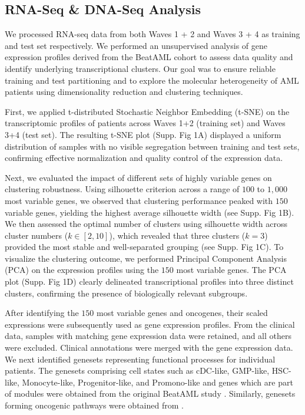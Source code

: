 \documentclass[pdflatex,sn-mathphys-num]{sn-jnl}%
\theoremstyle{thmstyleone}%
\theoremstyle{thmstyletwo}%
\theoremstyle{thmstylethree}%
\begin{document}
\subsection{RNA-Seq \& DNA-Seq Analysis}
We processed RNA-seq data from both Waves 1 + 2 and Waves 3 + 4 as training and test set respectively. We performed an unsupervised analysis of gene expression profiles derived from the BeatAML cohort to assess data quality and identify underlying transcriptional clusters. Our goal was to ensure reliable training and test partitioning and to explore the molecular heterogeneity of AML patients using dimensionality reduction and clustering techniques.

First, we applied t-distributed Stochastic Neighbor Embedding (t-SNE) \cite{van2008visualizing} on the transcriptomic profiles of patients across Waves 1+2 (training set) and Waves 3+4 (test set). The resulting t-SNE plot (Supp. Fig 1A) displayed a uniform distribution of samples with no visible segregation between training and test sets, confirming effective normalization and quality control of the expression data. 

Next, we evaluated the impact of different sets of highly variable genes on clustering robustness. Using silhouette criterion \cite{rousseeuw1987silhouettes} across a range of $100$ to $1,000$ most variable genes, we observed that clustering performance peaked with $150$ variable genes, yielding the highest average silhouette width (see Supp. Fig 1B). We then assessed the optimal number of clusters using silhouette width across cluster numbers ($k \in [2,10]$), which revealed that three clusters ($k=3$) provided the most stable and well-separated grouping (see Supp. Fig 1C). To visualize the clustering outcome, we performed Principal Component Analysis (PCA) on the expression profiles using the $150$ most variable genes. The PCA plot (Supp. Fig 1D) clearly delineated transcriptional profiles into three distinct clusters, confirming the presence of biologically relevant subgroups. 

After identifying the $150$ most variable genes and oncogenes, their scaled expressions were subsequently used as gene expression profiles. From the clinical data, samples with matching gene expression data were retained, and all others were excluded. Clinical annotations were merged with the gene expression data. We next identified genesets representing functional processes for individual patients. The genesets comprising cell states such as cDC-like, GMP-like, HSC-like, Monocyte-like, Progenitor-like, and Promono-like and genes which are part of modules were obtained from the original BeatAML study \cite{bottomly2022integrative}. Similarly, genesets forming oncogenic pathways were obtained from \cite{roelands2020oncogenic}. 
\end{document}
